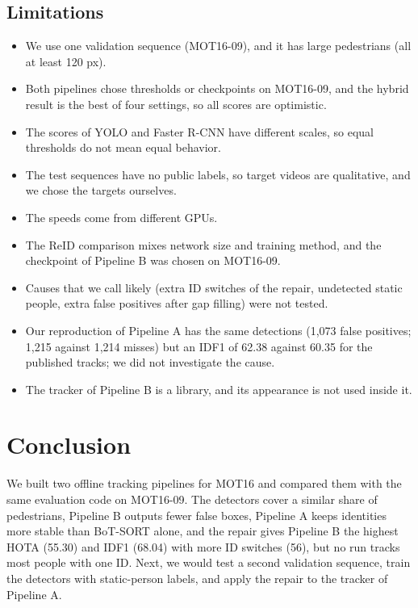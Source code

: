 \documentclass[11pt,letterpaper]{article}
\begin{document}
\subsection{Limitations}\label{sec:limits}
\begin{itemize}
\item We use one validation sequence (MOT16-09), and it has large pedestrians (all at least 120 px).
\item Both pipelines chose thresholds or checkpoints on MOT16-09, and the hybrid result is the best of four settings, so all scores are optimistic.
\item The scores of YOLO and Faster R-CNN have different scales, so equal thresholds do not mean equal behavior.
\item The test sequences have no public labels, so target videos are qualitative, and we chose the targets ourselves.
\item The speeds come from different GPUs.
\item The ReID comparison mixes network size and training method, and the checkpoint of Pipeline B was chosen on MOT16-09.
\item Causes that we call likely (extra ID switches of the repair, undetected static people, extra false positives after gap filling) were not tested.
\item Our reproduction of Pipeline A has the same detections (1,073 false positives; 1,215 against 1,214 misses) but an IDF1 of 62.38 against 60.35 for the published tracks; we did not investigate the cause.
\item The tracker of Pipeline B is a library, and its appearance is not used inside it.
\end{itemize}

\section{Conclusion}\label{sec:conclusion}
We built two offline tracking pipelines for MOT16 and compared them with the same evaluation code on MOT16-09.
The detectors cover a similar share of pedestrians, Pipeline B outputs fewer false boxes, Pipeline A keeps identities more stable than BoT-SORT alone, and the repair gives Pipeline B the highest HOTA (55.30) and IDF1 (68.04) with more ID switches (56), but no run tracks most people with one ID.
Next, we would test a second validation sequence, train the detectors with static-person labels, and apply the repair to the tracker of Pipeline A.

{\small

}
\end{document}

